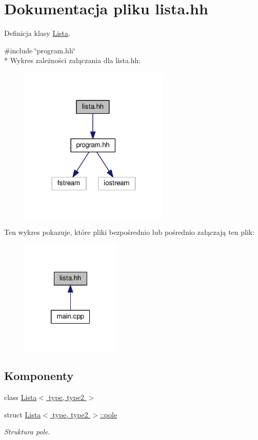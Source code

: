 \hypertarget{lista_8hh}{\section{Dokumentacja pliku lista.\-hh}
\label{lista_8hh}
}


Definicja klasy \hyperlink{class_lista}{Lista}.  


{\ttfamily \#include \char`\"{}program.\-hh\char`\"{}}\\*
Wykres zależności załączania dla lista.\-hh\-:\nopagebreak
\begin{figure}[H]
\begin{center}
\leavevmode
\includegraphics[width=202pt]{lista_8hh__incl}
\end{center}
\end{figure}
Ten wykres pokazuje, które pliki bezpośrednio lub pośrednio załączają ten plik\-:
\nopagebreak
\begin{figure}[H]
\begin{center}
\leavevmode
\includegraphics[width=134pt]{lista_8hh__dep__incl}
\end{center}
\end{figure}
\subsection*{Komponenty}
\begin{DoxyCompactItemize}
\item 
class \hyperlink{class_lista}{Lista$<$ type, type2 $>$}
\item 
struct \hyperlink{struct_lista_1_1pole}{Lista$<$ type, type2 $>$\-::pole}
\begin{DoxyCompactList}\small\item\em Struktura pole. \end{DoxyCompactList}\end{DoxyCompactItemize}
